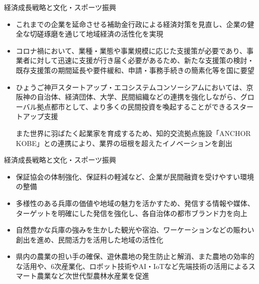 \documentclass[dvipdfmx]{beamer}
\begin{document}
    \begin{frame}{経済成長戦略と文化・スポーツ振興}{}
        \begin{small}
            \begin{itemize}
                \setlength{\parsep}{.5mm}
                \setlength{\itemsep}{2mm}
                \item これまでの企業を延命させる補助金行政による経済対策を見直し、企業の健全な切磋琢磨を通じて地域経済の活性化を実現
                \item コロナ禍において、業種・業態や事業規模に応じた支援策が必要であり、事業者に対して迅速に支援が行き届く必要があるため、新たな支援策の検討・既存支援策の期間延長や要件緩和、申請・事務手続きの簡素化等を国に要望
                \item ひょうご神戸スタートアップ・エコシステムコンソーシアムにおいては、京阪神の自治体、経済団体、大学、民間組織などの連携を強化しながら、グローバル拠点都市として、より多くの民間投資を喚起することができるスタートアップ支援\par
                また世界に羽ばたく起業家を育成するため、知的交流拠点施設「ANCHOR KOBE」との連携により、業界の垣根を超えたイノベーションを創出
            \end{itemize}
        \end{small}
    \end{frame}
    
    \begin{frame}{経済成長戦略と文化・スポーツ振興}{}
        \begin{small}
            \begin{itemize}
                \setlength{\parsep}{.5mm}
                \setlength{\itemsep}{2mm}
                \item 保証協会の体制強化、保証料の軽減など、企業が民間融資を受けやすい環境の整備
                \item 多様性のある兵庫の価値や地域の魅力を活かすため、発信する情報や媒体、ターゲットを明確にした発信を強化し、各自治体の都市ブランド力を向上
                \item 自然豊かな兵庫の強みを生かした観光や宿泊、ワーケーションなどの賑わい創出を進め、民間活力を活用した地域の活性化
                \item 県内の農業の担い手の確保、遊休農地の発生防止と解消、また農地の効率的な活用や、6次産業化、ロボット技術やAI・IoTなど先端技術の活用によるスマート農業など次世代型農林水産業を促進
            \end{itemize}
        \end{small}
    \end{frame}
    
\end{document}
